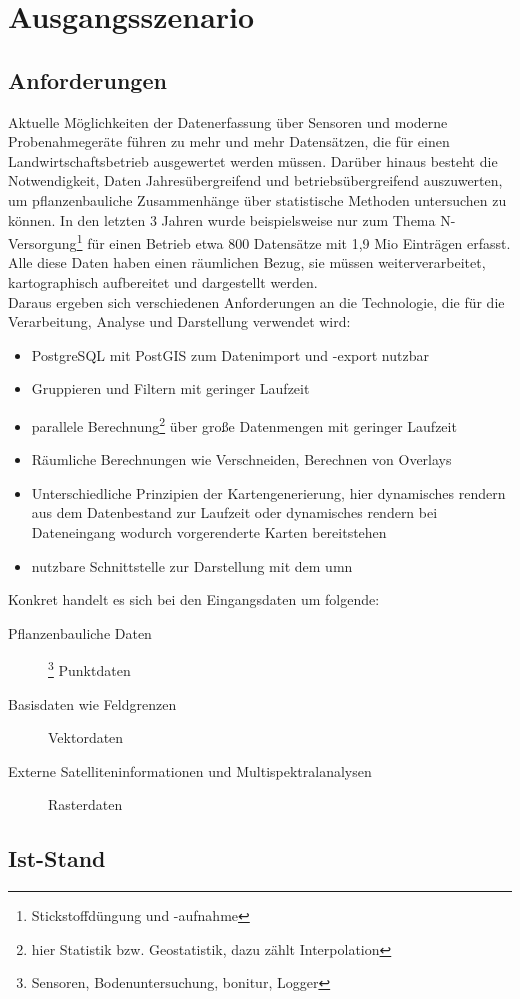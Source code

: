 \chapter{Ausgangsszenario}

\section{Anforderungen}

Aktuelle Möglichkeiten der Datenerfassung über Sensoren und moderne Probenahmegeräte führen zu mehr und mehr Datensätzen, die für einen Landwirtschaftsbetrieb ausgewertet werden müssen. Darüber hinaus besteht die Notwendigkeit, Daten Jahresübergreifend und betriebsübergreifend auszuwerten, um pflanzenbauliche Zusammenhänge über statistische Methoden untersuchen zu können.
In den letzten 3 Jahren wurde beispielsweise nur zum Thema N-Versorgung\footnote{Stickstoffdüngung und -aufnahme} für einen Betrieb etwa 800 Datensätze mit 1,9 Mio Einträgen erfasst. Alle diese Daten haben einen räumlichen Bezug, sie müssen weiterverarbeitet, kartographisch aufbereitet und dargestellt werden.\\
Daraus ergeben sich verschiedenen Anforderungen an die Technologie, die für die Verarbeitung, Analyse und Darstellung verwendet wird:
\begin{itemize}
\item PostgreSQL mit PostGIS zum Datenimport und -export nutzbar
\item Gruppieren und Filtern mit geringer Laufzeit
\item parallele Berechnung\footnote{hier Statistik bzw. Geostatistik, dazu zählt Interpolation} über große Datenmengen mit geringer Laufzeit
\item Räumliche Berechnungen wie Verschneiden, Berechnen von Overlays
\item  Unterschiedliche Prinzipien der Kartengenerierung, hier dynamisches rendern aus dem Datenbestand zur Laufzeit oder dynamisches rendern bei Dateneingang wodurch vorgerenderte Karten bereitstehen
\item nutzbare Schnittstelle zur Darstellung mit dem \Gls{umn}
\end{itemize}

Konkret handelt es sich bei den Eingangsdaten um folgende:
\begin{description}
\item[Pflanzenbauliche Daten]\footnote{Sensoren, Bodenuntersuchung, \Gls{bonitur}, Logger} Punktdaten
\item[Basisdaten wie Feldgrenzen] Vektordaten
\item[Externe Satelliteninformationen und Multispektralanalysen] Rasterdaten
\end{description}



\section{Ist-Stand}

